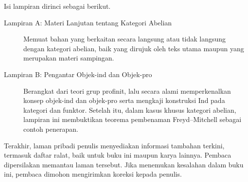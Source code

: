 Isi lampiran dirinci sebagai berikut.
\begin{description}
	\item[Lampiran A: Materi Lanjutan tentang Kategori Abelian] Memuat bahan
	yang berkaitan secara langsung atau tidak langsung dengan kategori
	abelian, baik yang dirujuk oleh teks utama maupun yang merupakan materi
	sampingan.
	\item[Lampiran B: Pengantar Objek-ind dan Objek-pro] Berangkat dari teori
	grup profinit, lalu secara alami memperkenalkan konsep objek-ind dan
	objek-pro serta mengkaji konstruksi Ind pada kategori dan funktor.
	Setelah itu, dalam kasus khusus kategori abelian, lampiran ini membuktikan
	teorema pembenaman Freyd--Mitchell sebagai contoh penerapan.
\end{description}

Terakhir, laman pribadi penulis menyediakan informasi tambahan terkini,
termasuk daftar ralat, baik untuk buku ini maupun karya lainnya. Pembaca
dipersilakan memantau laman tersebut. Jika menemukan kesalahan dalam buku ini,
pembaca dimohon mengirimkan koreksi kepada penulis.
